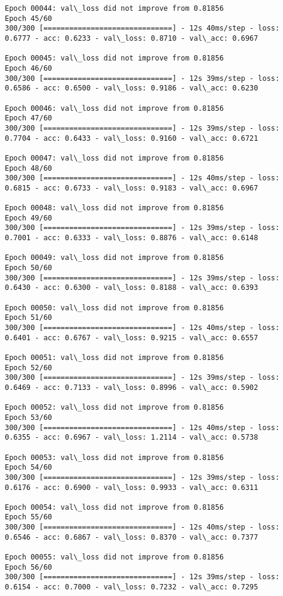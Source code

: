 \documentclass[11pt]{article}
\begin{document}
\begin{Verbatim}[commandchars=\\\{\}]
Epoch 00044: val\_loss did not improve from 0.81856
Epoch 45/60
300/300 [==============================] - 12s 40ms/step - loss: 0.6777 - acc: 0.6233 - val\_loss: 0.8710 - val\_acc: 0.6967

Epoch 00045: val\_loss did not improve from 0.81856
Epoch 46/60
300/300 [==============================] - 12s 39ms/step - loss: 0.6586 - acc: 0.6500 - val\_loss: 0.9186 - val\_acc: 0.6230

Epoch 00046: val\_loss did not improve from 0.81856
Epoch 47/60
300/300 [==============================] - 12s 39ms/step - loss: 0.7704 - acc: 0.6433 - val\_loss: 0.9160 - val\_acc: 0.6721

Epoch 00047: val\_loss did not improve from 0.81856
Epoch 48/60
300/300 [==============================] - 12s 40ms/step - loss: 0.6815 - acc: 0.6733 - val\_loss: 0.9183 - val\_acc: 0.6967

Epoch 00048: val\_loss did not improve from 0.81856
Epoch 49/60
300/300 [==============================] - 12s 39ms/step - loss: 0.7001 - acc: 0.6333 - val\_loss: 0.8876 - val\_acc: 0.6148

Epoch 00049: val\_loss did not improve from 0.81856
Epoch 50/60
300/300 [==============================] - 12s 39ms/step - loss: 0.6430 - acc: 0.6300 - val\_loss: 0.8188 - val\_acc: 0.6393

Epoch 00050: val\_loss did not improve from 0.81856
Epoch 51/60
300/300 [==============================] - 12s 40ms/step - loss: 0.6401 - acc: 0.6767 - val\_loss: 0.9215 - val\_acc: 0.6557

Epoch 00051: val\_loss did not improve from 0.81856
Epoch 52/60
300/300 [==============================] - 12s 39ms/step - loss: 0.6469 - acc: 0.7133 - val\_loss: 0.8996 - val\_acc: 0.5902

Epoch 00052: val\_loss did not improve from 0.81856
Epoch 53/60
300/300 [==============================] - 12s 40ms/step - loss: 0.6355 - acc: 0.6967 - val\_loss: 1.2114 - val\_acc: 0.5738

Epoch 00053: val\_loss did not improve from 0.81856
Epoch 54/60
300/300 [==============================] - 12s 39ms/step - loss: 0.6176 - acc: 0.6900 - val\_loss: 0.9933 - val\_acc: 0.6311

Epoch 00054: val\_loss did not improve from 0.81856
Epoch 55/60
300/300 [==============================] - 12s 40ms/step - loss: 0.6546 - acc: 0.6867 - val\_loss: 0.8370 - val\_acc: 0.7377

Epoch 00055: val\_loss did not improve from 0.81856
Epoch 56/60
300/300 [==============================] - 12s 39ms/step - loss: 0.6154 - acc: 0.7000 - val\_loss: 0.7232 - val\_acc: 0.7295


\end{Verbatim}
\end{document}
